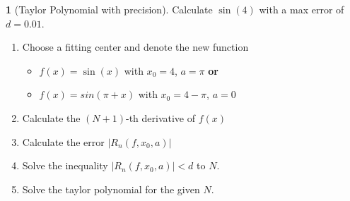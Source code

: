\documentclass[a4paper, 10pt]{article}
\theoremstyle{definition}
\theoremstyle{ex}
\newtheorem*{exercise}{}
\theoremstyle{named}
\begin{document}
\begin{exercise}[Taylor Polynomial with precision]
    Calculate $\sin(4)$ with a max error of $d = 0.01$.
    \begin{enumerate}
        \item Choose a fitting center and denote the new function
        \begin{itemize}
            \item $f(x) = \sin(x)$ with $x_0 = 4$, $a = \pi$ \textbf{or}
            \item $f(x) = sin(\pi + x)$ with $x_0 = 4 - \pi$, $a = 0$
        \end{itemize}
        \item Calculate the $(N + 1)$-th derivative of $f(x)$
        \item Calculate the error $|R_n(f,x_0,a)|$
        \item Solve the inequality $|R_n(f, x_0, a)| < d$ to $N$.
        \item Solve the taylor polynomial for the given $N$.
    \end{enumerate}
\end{exercise}
\end{document}
